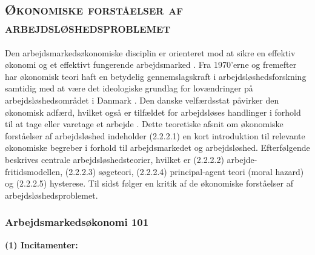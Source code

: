 \newpage \subsection{\textsc{Økonomiske forståelser af arbejdsløshedsproblemet}}


Den arbejdsmarkedsøkonomiske disciplin er orienteret mod at sikre en effektiv økonomi og et effektivt fungerende arbejdsmarked \parencite[26]{Halvorsen1999}. Fra 1970'erne og fremefter har økonomisk teori haft en betydelig gennemslagskraft i arbejdsløshedsforskning samtidig med at være det ideologiske grundlag for lovændringer på arbejdsløshedsområdet i Danmark \parencite[19]{Andersen2003}. Den danske velfærdsstat påvirker den økonomisk adfærd, hvilket også er tilfældet for arbejdsløses handlinger i forhold til at tage eller varetage et arbejde \parencite[26]{Halvorsen1999}. Dette teoretiske afsnit om økonomiske forståelser af arbejdsløshed indeholder (2.2.2.1) en kort introduktion til relevante økonomiske begreber i forhold til arbejdsmarkedet og arbejdsløshed. Efterfølgende beskrives centrale arbejdsløshedsteorier, hvilket er (2.2.2.2) arbejde-fritidsmodellen, (2.2.2.3) søgeteori, (2.2.2.4) principal-agent teori (moral hazard) og (2.2.2.5) hysterese. Til sidst følger en kritik af de økonomiske forståelser af arbejdsløshedsproblemet.


\subsubsection{Arbejdsmarkedsøkonomi 101 \parencite[24-26]{Halvorsen1999}}

\noindent \textbf{(1) Incitamenter:} \parencite[1-20]{Mankiw2011}


